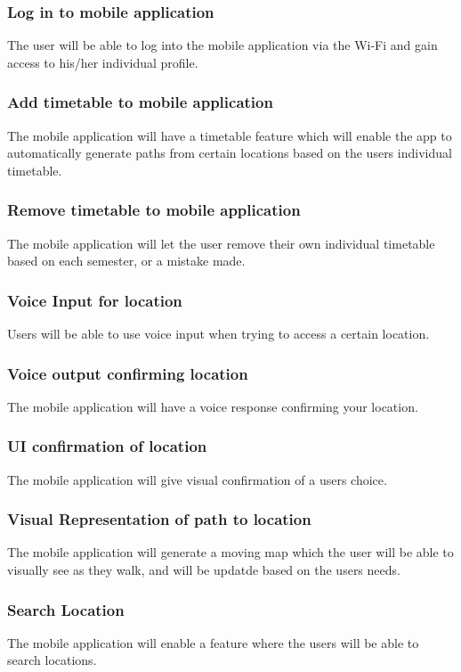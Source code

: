 \documentclass{article}
\begin{document}
\subsubsection{Log in to mobile application}
The user will be able to log into the mobile application via the Wi-Fi and gain access to his/her individual profile.
\subsubsection{Add timetable to mobile application}
The mobile application will have a timetable feature which will enable the app to automatically generate paths from certain locations based on the users individual timetable. 
\subsubsection{Remove timetable to mobile application}
The mobile application will let the user remove their own individual timetable based on each semester, or a mistake made.
\subsubsection{Voice Input for location}
Users will be able to use voice input when trying to access a certain location.
\subsubsection{Voice output confirming location}
The mobile application will have a voice response confirming your location.
\subsubsection{UI confirmation of location}
The mobile application will give visual confirmation of a users choice.
\subsubsection{Visual Representation of path to location}
The mobile application will generate a moving map which the user will be able to visually see as they walk, and will be updatde based on the users needs.
\subsubsection{Search Location}
The mobile application will enable a feature where the users will be able to search locations.

\newpage
\centering
\end{document}

